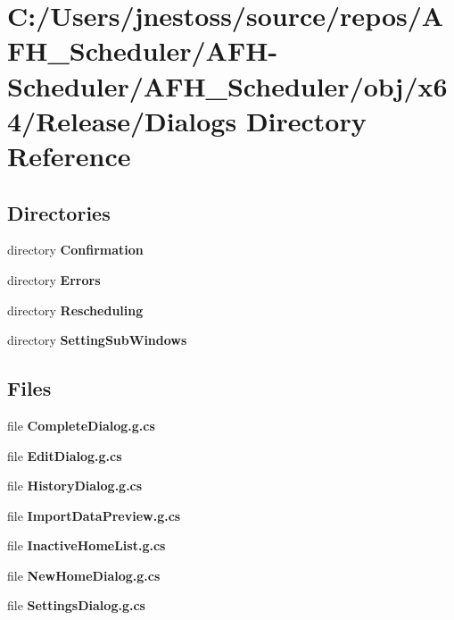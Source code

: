 \section{C\+:/\+Users/jnestoss/source/repos/\+A\+F\+H\+\_\+\+Scheduler/\+A\+F\+H-\/\+Scheduler/\+A\+F\+H\+\_\+\+Scheduler/obj/x64/\+Release/\+Dialogs Directory Reference}
\label{dir_ebe83a03dddc6d3b4616e65f10eed964}
\subsection*{Directories}
\begin{DoxyCompactItemize}
\item 
directory \textbf{ Confirmation}
\item 
directory \textbf{ Errors}
\item 
directory \textbf{ Rescheduling}
\item 
directory \textbf{ Setting\+Sub\+Windows}
\end{DoxyCompactItemize}
\subsection*{Files}
\begin{DoxyCompactItemize}
\item 
file \textbf{ Complete\+Dialog.\+g.\+cs}
\item 
file \textbf{ Edit\+Dialog.\+g.\+cs}
\item 
file \textbf{ History\+Dialog.\+g.\+cs}
\item 
file \textbf{ Import\+Data\+Preview.\+g.\+cs}
\item 
file \textbf{ Inactive\+Home\+List.\+g.\+cs}
\item 
file \textbf{ New\+Home\+Dialog.\+g.\+cs}
\item 
file \textbf{ Settings\+Dialog.\+g.\+cs}
\end{DoxyCompactItemize}
